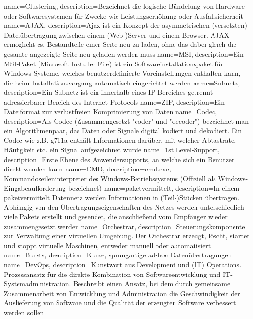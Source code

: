 {
    name=Clustering,
    description={Bezeichnet die logische Bündelung von Hardware- oder Softwaresystemen für Zwecke wie Leistungserhöhung oder Ausfallsicherheit}
}
{
    name=AJAX,
    description={Ajax ist ein Konzept der asymmetrischen (versetzten) Dateiübertragung zwischen einem (Web-)Server und einem Browser. AJAX ermöglicht es, Bestandteile einer Seite neu zu laden, ohne das dabei gleich die gesamte angezeigte Seite neu geladen werden muss}
}
{
    name=MSI,
    description={Ein \acrshort{MSI}-Paket (Microsoft Installer File) ist ein Softwareinstallationspaket für Windows-Systeme, welches benutzerdefinierte Voreinstellungen enthalten kann, die beim Installationsvorgang automatisch eingerichtet werden}
}
{
    name=Subnetz,
    description={Ein Subnetz ist ein innerhalb eines IP-Bereiches getrennt adressierbarer Bereich des Internet-Protocols}
}
{
    name=ZIP,
    description={Ein Dateiformat zur verlustfreien Komprimierung von Daten}
}
{
    name=Codec,
    description={Als Codec (Zusammengesetzt "coder" und "decoder") bezeichnet man ein Algorithmenpaar, das Daten oder Signale digital kodiert und dekodiert. Ein Codec wie z.B. g711a enthält Informationen darüber, mit welcher Abtastrate, Häufigkeit etc. ein Signal aufgezeichnet wurde}
}
{
    name=1st Level-Support,
    description={Erste Ebene des Anwendersupports, an welche sich ein Benutzer direkt wenden kann}
}
{
    name=CMD,
    description={cmd.exe, Kommandozeileninterpreter des Windows-Betriebssystems (Offiziell als Windows-Eingabeaufforderung bezeichnet)}
}
{
    name=paketvermittelt,
    description={In einem paketvermittelt Datennetz werden Informationen in (Teil-)Stücken übertragen. Abhängig von den Übertragungseigenschaften des Netzes werden unterschiedlich viele Pakete erstellt und gesendet, die anschließend vom Empfänger wieder zusammengesetzt werden}
}
{
    name=Orchestrar,
    description={Steuerungskomponente zur Verwaltung einer virtuellen Umgebung. Der Orchestrar erzeugt, löscht, startet und stoppt virtuelle Maschinen, entweder manuell oder automatisiert}
}
{
    name=Bursts,
    description={Kurze, sprungartige ad-hoc Datenübertragungen}
}
{
    name=DevOps,
    description={Kunstwort aus Development und (IT) Operations. Prozessansatz für die direkte Kombination von Softwareentwicklung und IT-Systemadministration.  Beschreibt einen Ansatz, bei dem durch gemeinsame Zusammenarbeit von Entwicklung und Administration die Geschwindigkeit der Auslieferung von Software und die Qualität der erzeugten Software verbessert werden sollen}
}
